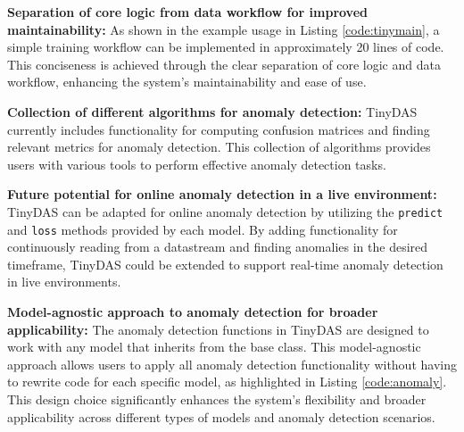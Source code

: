 \textbf{Separation of core logic from data workflow for improved maintainability:}
As shown in the example usage in Listing \ref{code:tinymain}, a simple training workflow can be implemented in approximately 20 lines of code. This conciseness is achieved through the clear separation of core logic and data workflow, enhancing the system's maintainability and ease of use.

\textbf{Collection of different algorithms for anomaly detection:}
TinyDAS currently includes functionality for computing confusion matrices and finding relevant metrics for anomaly detection. This collection of algorithms provides users with various tools to perform effective anomaly detection tasks.

\textbf{Future potential for online anomaly detection in a live environment:}
TinyDAS can be adapted for online anomaly detection by utilizing the \lstinline|predict| and \lstinline|loss| methods provided by each model. By adding functionality for continuously reading from a datastream and finding anomalies in the desired timeframe, TinyDAS could be extended to support real-time anomaly detection in live environments.

\textbf{Model-agnostic approach to anomaly detection for broader applicability:}
The anomaly detection functions in TinyDAS are designed to work with any model that inherits from the base class. This model-agnostic approach allows users to apply all anomaly detection functionality without having to rewrite code for each specific model, as highlighted in Listing \ref{code:anomaly}. This design choice significantly enhances the system's flexibility and broader applicability across different types of models and anomaly detection scenarios.



